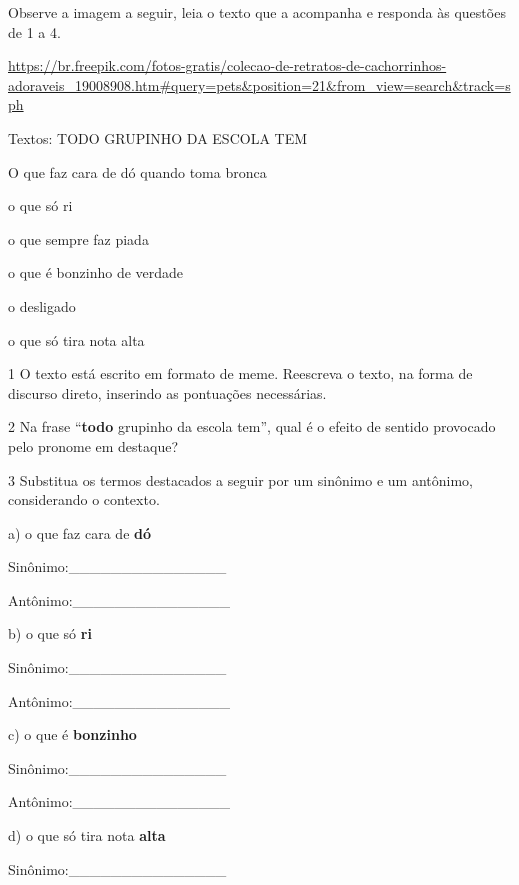 Observe a imagem a seguir, leia o texto que a acompanha e responda às
questões de 1 a 4.

\url{https://br.freepik.com/fotos-gratis/colecao-de-retratos-de-cachorrinhos-adoraveis_19008908.htm\#query=pets\&position=21\&from_view=search\&track=sph}

Textos: TODO GRUPINHO DA ESCOLA TEM

O que faz cara de dó quando toma bronca

o que só ri

o que sempre faz piada

o que é bonzinho de verdade

o desligado

o que só tira nota alta

\num{1} O texto está escrito em formato de meme. Reescreva o texto, na
forma de discurso direto, inserindo as pontuações necessárias.



\num{2} Na frase ``\textbf{todo} grupinho da escola tem'', qual é o
efeito de sentido provocado pelo pronome em destaque?



\num{3} Substitua os termos destacados a seguir por um sinônimo e um
antônimo, considerando o contexto.

a) o que faz cara de \textbf{dó}

Sinônimo:\_\_\_\_\_\_\_\_\_\_\_\_\_\_\_

Antônimo:\_\_\_\_\_\_\_\_\_\_\_\_\_\_\_

b) o que só \textbf{ri}

Sinônimo:\_\_\_\_\_\_\_\_\_\_\_\_\_\_\_

Antônimo:\_\_\_\_\_\_\_\_\_\_\_\_\_\_\_

c) o que é \textbf{bonzinho}

Sinônimo:\_\_\_\_\_\_\_\_\_\_\_\_\_\_\_

Antônimo:\_\_\_\_\_\_\_\_\_\_\_\_\_\_\_

d) o que só tira nota \textbf{alta}

Sinônimo:\_\_\_\_\_\_\_\_\_\_\_\_\_\_\_

